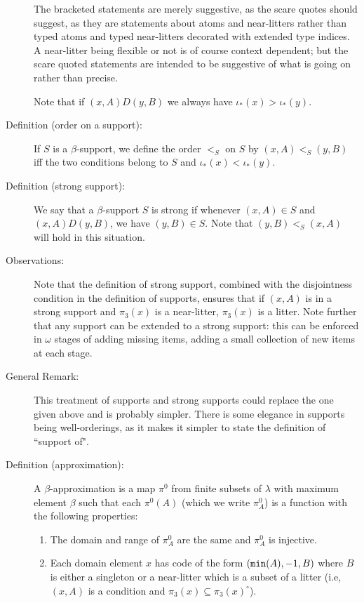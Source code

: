 \documentclass[112pt]{article}
\begin{document}
\begin{description}
The bracketed statements are merely suggestive, as the scare quotes should suggest, as they are statements about atoms and near-litters rather than typed atoms and typed near-litters decorated with extended type indices.  A near-litter being flexible or not is of course context dependent;  but the scare quoted statements are intended to be suggestive of what is going on rather than precise.

Note that if $(x,A) D (y,B)$ we always have $\iota_*(x)>\iota_*(y)$.

\item[Definition (order on a support):]  If $S$ is a $\beta$-support, we define the order $<_S$ on $S$ by $(x,A) <_S (y,B)$ iff the two conditions belong to $S$ and
$\iota_*(x)<\iota_*(y)$.

\item[Definition (strong support):]  We say that a $\beta$-support $S$ is strong if whenever $(x,A) \in S$ and $(x,A) D (y,B)$, we have $(y,B)\in S$.  Note that $(y,B) <_S (x,A)$ will hold in this situation.

\item[Observations:]  Note that the definition of strong support, combined with the disjointness condition in the definition of supports, ensures that
if $(x,A)$ is in a strong support and $\pi_3(x)$ is a near-litter, $\pi_3(x)$ is a litter.  Note further that any support can be extended to a strong support:  this can be enforced in $\omega$ stages of adding missing items, adding a small collection of new items at each stage.

\item[General Remark:]  This treatment of supports and strong supports could replace the one given above and is probably simpler.   There is some elegance in supports being well-orderings, as it makes it simpler to state the definition of ``support of".

\item[Definition (approximation):]   A $\beta$-approximation is a map $\pi^0$ from finite subsets of $\lambda$ with maximum element $\beta$ such
that each $\pi^0(A)$ (which we write $\pi^0_A$) is a function with the following properties:

\begin{enumerate}

\item  The domain and range of $\pi^0_A$ are the same and $\pi^0_A$ is injective.

\item Each domain element $x$ has code of the form $({\tt min}(A),-1,B)$ where $B$ is either a singleton or a near-litter which is a subset of a litter (i.e, $(x,A)$ is a condition and $\pi_3(x) \subseteq \pi_3(x)^\circ$).


\end{enumerate}
\end{description}
\end{document}
